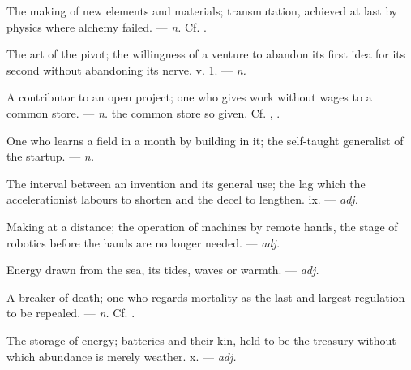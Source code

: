  The making of new elements and materials; transmutation, achieved at last by physics where alchemy failed. ---  \textit{n.} Cf. .

 The art of the pivot; the willingness of a venture to abandon its first idea for its second without abandoning its nerve.   v. 1. ---  \textit{n.}

 A contributor to an open project; one who gives work without wages to a common store. ---  \textit{n.} the common store so given. Cf. , .

 One who learns a field in a month by building in it; the self-taught generalist of the startup. ---  \textit{n.}

 The interval between an invention and its general use; the lag which the accelerationist labours to shorten and the decel to lengthen.   ix. ---  \textit{adj.}

 Making at a distance; the operation of machines by remote hands, the stage of robotics before the hands are no longer needed. ---  \textit{adj.}

 Energy drawn from the sea, its tides, waves or warmth. ---  \textit{adj.}

 A breaker of death; one who regards mortality as the last and largest regulation to be repealed.  ---  \textit{n.} Cf. .

 The storage of energy; batteries and their kin, held to be the treasury without which abundance is merely weather.   x. ---  \textit{adj.}

